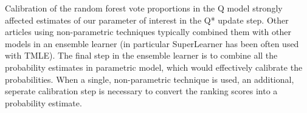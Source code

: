 \documentclass[]{article}\usepackage[]{graphicx}\usepackage[]{color}
\begin{document}


 


Calibration of the random forest vote proportions in the Q model strongly affected estimates of our parameter of interest in the Q* update step. Other articles using non-parametric techniques typically combined them with other models in an ensemble learner (in particular SuperLearner has been often used with TMLE). The final step in the ensemble learner is to combine all the probability estimates in parametric model, which would effectively calibrate the probabilities. When a single, non-parametric technique is used, an additional, seperate calibration step is necessary to convert the ranking scores into a probability estimate.

\printbibliography
\end{document}
